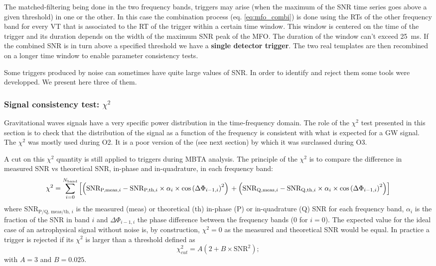 The matched-filtering being done in the two frequency bands, triggers may arise (when the maximum of the SNR time series goes above a given threshold)  in one or the other.
In this case the combination process (eq. \ref{eq:mfo_combi}) is done using the RTs of the other frequency band for every VT that is associated to the RT of the trigger within a certain time window.
This window is centered on the time of the trigger and its duration depends on the width of the maximum SNR peak of the MFO.
The duration of the window can't exceed \SI{25}{ms}.
If the combined SNR is in turn above a specified threshold we have a \textbf{single detector trigger}.
The two real templates are then recombined on a longer time window to enable parameter consistency tests.

Some triggers produced by noise can sometimes have quite large values of SNR.
In order to identify and reject them some tools were developped.
We present here three of them.

\subsubsection{Signal consistency test: $\chi^2$}
\label{sec:chi2}
Gravitational waves signals have a very specific power distribution in the time-frequency domain.
The role of the $\chi^2$ test presented in this section is to check that the distribution of the signal as a function of the frequency is consistent with what is expected for a GW signal.
The $\chi^2$ was mostly used during O2.
It is a poor version of the \achi (see next section) by which it was surclassed during O3.

A cut on this $\chi^2$ quantity is still applied to triggers during MBTA analysis.
The principle of the $\chi^2$ is to compare the difference in measured SNR  vs theoretical SNR, in-phase and in-quadrature, in each frequency band:
%
\begin{dmath}
  \label{eq:chi2}
  \chi^2 =  \sum_{i=0}^{N_{\textrm{band}}} \left[  \left( \textrm{SNR}_{\textrm{P,meas,}i} - \textrm{SNR}_{\textrm{P,th,}i} \times \alpha_{i} \times \cos\left(\Delta\Phi_{i-1,i} \right)^2 \right)\\
    + \left( \textrm{SNR}_{\textrm{Q,meas,}i} - \textrm{SNR}_{\textrm{Q,th,}i} \times \alpha_{i} \times \cos\left(\Delta\Phi_{i-1,i} \right)^2 \right) \right]
\end{dmath}
% 
where $\textrm{SNR}_{\textrm{P/Q, meas/th, }i}$ is the measured (meas) or theoretical (th) in-phase (P) or in-quadrature (Q) SNR for each frequency band, $\alpha_{i}$ is the fraction of the SNR in band $i$ and $\Delta\Phi_{i-1,i}$ the phase difference between the frequency bands (0 for $i=0$).
The expected value for the ideal case of an astrophysical signal without noise is, by construction, $\chi^2=0$ as the measured and theoretical SNR would be equal.
In practice a trigger is rejected if its $\chi^2$ is larger than a threshold defined as
%
\begin{equation}
  \chi^2_{cut} = A(2 + B \times \textrm{SNR}^2);
  \label{eq:chi2cut}
\end{equation}
%
with $A = 3$ and $B = 0.025$.

